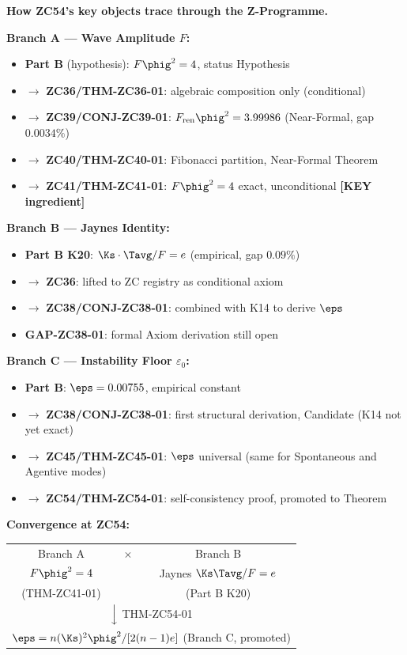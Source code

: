 \documentclass[12pt, a4paper]{article}
\begin{document}
\begin{genealogybox}
\textbf{How ZC54's key objects trace through the Z-Programme.}

\medskip
\textbf{Branch A --- Wave Amplitude $F$:}
\begin{itemize}[leftmargin=2em, noitemsep]
\item \textbf{Part B} (hypothesis): $F\phig^2 = 4$, status Hypothesis
\item $\to$ \textbf{ZC36/THM-ZC36-01}: algebraic composition only (conditional)
\item $\to$ \textbf{ZC39/CONJ-ZC39-01}: $F_{\rm ren}\phig^2 = 3.99986$
  (Near-Formal, gap $0.0034\%$)
\item $\to$ \textbf{ZC40/THM-ZC40-01}: Fibonacci partition, Near-Formal Theorem
\item $\to$ \textbf{ZC41/THM-ZC41-01}: $F\phig^2 = 4$ exact, unconditional
  \textbf{[KEY ingredient]}
\end{itemize}

\medskip
\textbf{Branch B --- Jaynes Identity:}
\begin{itemize}[leftmargin=2em, noitemsep]
\item \textbf{Part B K20}: $\Ks\cdot\Tavg/F = e$ (empirical, gap $0.09\%$)
\item $\to$ \textbf{ZC36}: lifted to ZC registry as conditional axiom
\item $\to$ \textbf{ZC38/CONJ-ZC38-01}: combined with K14 to derive $\eps$
\item \textbf{GAP-ZC38-01}: formal Axiom derivation still open
\end{itemize}

\medskip
\textbf{Branch C --- Instability Floor $\varepsilon_0$:}
\begin{itemize}[leftmargin=2em, noitemsep]
\item \textbf{Part B}: $\eps = 0.00755$, empirical constant
\item $\to$ \textbf{ZC38/CONJ-ZC38-01}: first structural derivation,
  Candidate (K14 not yet exact)
\item $\to$ \textbf{ZC45/THM-ZC45-01}: $\eps$ universal (same for
  Spontaneous and Agentive modes)
\item $\to$ \textbf{ZC54/THM-ZC54-01}: self-consistency proof, promoted to Theorem
\end{itemize}

\medskip
\textbf{Convergence at ZC54:}
\begin{center}
\begin{tabular}{@{}ccc@{}}
Branch A & $\times$ & Branch B \\
$F\phig^2 = 4$ & & Jaynes $\Ks\Tavg/F = e$ \\
(THM-ZC41-01) & & (Part B K20) \\
\multicolumn{3}{c}{$\Big\downarrow$ THM-ZC54-01} \\
\multicolumn{3}{c}{$\eps = n(\Ks)^2\phig^2/[2(n-1)e]$ (Branch C, promoted)} \\
\end{tabular}
\end{center}


\end{genealogybox}
\end{document}
